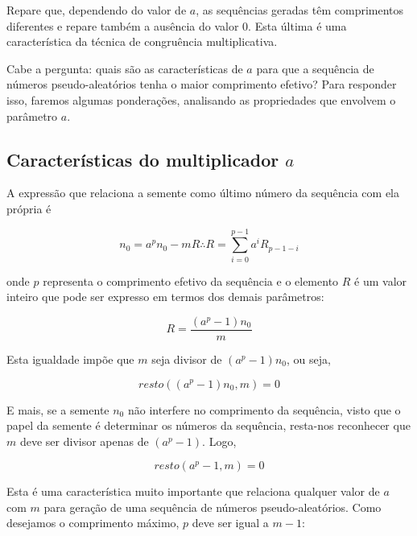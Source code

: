 \documentclass[a4paper,12pt,oneside,onecolumn]{uerj/uerj}
\begin{document}
Repare que, dependendo do valor de $a$, as sequências geradas têm comprimentos diferentes e repare também a ausência do valor $0$. Esta última é uma característica da técnica de congruência multiplicativa.

Cabe a pergunta: quais são as características de $a$ para que a sequência de números pseudo-aleatórios tenha o maior comprimento efetivo? Para responder isso, faremos algumas ponderações, analisando as propriedades que envolvem o parâmetro $a$.

\subsection{Características do multiplicador $a$}

A expressão que relaciona a semente como último número da sequência com ela própria é

\begin{equation}
n_0 = a^{p}n_0 - mR \therefore R = \sum_{i=0}^{p-1} a^iR_{p-1-i}
\end{equation}

\noindent onde $p$ representa o comprimento efetivo da sequência e o elemento $R$ é um valor inteiro que pode ser expresso em termos dos demais parâmetros:

\begin{equation}
R = \frac{(a^{p}-1)n_0}{m}
\end{equation}

\noindent Esta igualdade impõe que $m$ seja divisor de $(a^{p}-1)n_0$, ou seja,

\begin{equation}
resto((a^{p}-1)n_0,m)=0
\end{equation}

\noindent E mais, se a semente $n_0$ não interfere no comprimento da sequência, visto que o papel da semente é determinar os números da sequência, resta-nos reconhecer que $m$ deve ser divisor apenas de $(a^{p}-1)$. Logo,

\begin{equation}
resto(a^{p}-1,m)=0
\end{equation}

\noindent Esta é uma característica muito importante que relaciona qualquer valor de $a$ com $m$ para geração de uma sequência de números pseudo-aleatórios. Como desejamos o comprimento máximo, $p$ deve ser igual a $m-1$:
\end{document}
